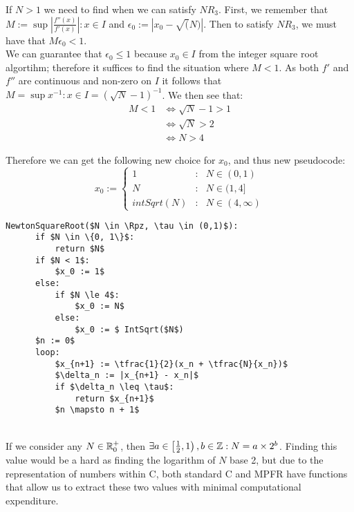 If \(N > 1\) we need to find when we can satisfy \(NR_3\). First, we remember that \(M := \sup{\left|\tfrac{f''(x)}{f'(x)}\right| : x \in I}\) and \(\epsilon_0 := \left|x_0 - \sqrt(N)\right|\). Then to satisfy \(NR_3\), we must have that \(M\epsilon_0 < 1\).\\

We can guarantee that \(\epsilon_0 \le 1\) because \(x_0 \in I\) from the integer square root algortihm; therefore it suffices to find the situation where \(M < 1\). As both \(f'\) and \(f''\) are continuous and non-zero on \(I\) it follows that \(M = \sup{x^{-1} : x \in I} = (\sqrt{N} - 1)^{-1}\). We then see that:
\begin{displaymath}
	\begin{align*}
		M < 1 &\iff \sqrt{N} - 1 > 1\\
			  &\iff \sqrt{N} > 2\\
			  &\iff N > 4
	\end{align*}
\end{displaymath}

Therefore we can get the following new choice for \(x_0\), and thus new pseudocode:
\begin{displaymath}
	x_0 := \left\{\begin{array}{lcl}
		1 &: &N \in (0,1)\\
		N &: &N \in (1,4]\\
		intSqrt(N) &: &N \in (4, \infty)
	\end{array}\right.
\end{displaymath}

\label{PCD_"Newton Square Root v2"}
\begin{lstlisting}[frame=single,mathescape,caption={Basic Newton Method for Square Root}]
  NewtonSquareRoot($N \in \Rpz, \tau \in (0,1)$):
      if $N \in \{0, 1\}$:
          return $N$
      if $N < 1$:
          $x_0 := 1$
      else:
          if $N \le 4$:
              $x_0 := N$
          else:
              $x_0 := $ IntSqrt($N$)
      $n := 0$
      loop:
          $x_{n+1} := \tfrac{1}{2}(x_n + \tfrac{N}{x_n})$
          $\delta_n := |x_{n+1} - x_n|$
          if $\delta_n \leq \tau$:
              return $x_{n+1}$
          $n \mapsto n + 1$
\end{lstlisting}

\\

If we consider any \(N \in \mathbb{R}^+_0\), then \(\exists a \in \left[\frac{1}{2}, 1\right), b \in \mathbb{Z} : N = a \times 2^b\). Finding this value would be a hard as finding the logarithm of \(N\) base 2, but due to the representation of numbers within C, both standard C and MPFR have functions that allow us to extract these two values with minimal computational expenditure.\\

